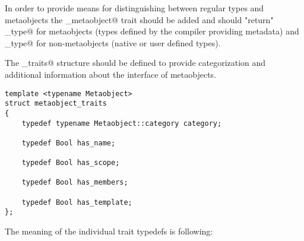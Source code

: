 In order to provide means for distinguishing between regular types
and metaobjects the \verb@is_metaobject@ trait should be added
and should "return" \verb@true_type@ for metaobjects (types defined
by the compiler providing metadata) and \verb@false_type@
for non-metaobjects (native or user defined types).

The \verb@metaobject_traits@ structure should be defined to provide
categorization and additional information about the interface of metaobjects.

\begin{lstlisting}
template <typename Metaobject>
struct metaobject_traits
{
	typedef typename Metaobject::category category;

	typedef Bool has_name;

	typedef Bool has_scope;

	typedef Bool has_members;

	typedef Bool has_template;
};
\end{lstlisting}

The meaning of the individual trait typedefs is following:

